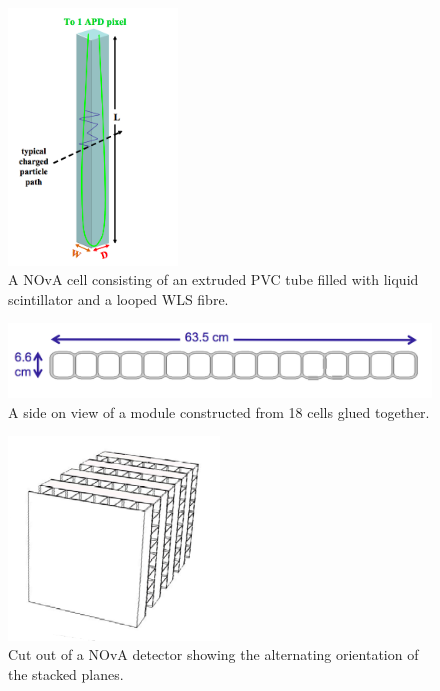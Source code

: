 \begin{figure}
  \centering
  \includegraphics[width=0.4\textwidth]{../../img/det/gen/nova_cell.png}
  \caption{A NOvA cell consisting of an extruded
    PVC tube filled with liquid scintillator and a looped WLS fibre.}
  \label{fig:cell}
\end{figure}


\begin{figure}
  \centering
  \includegraphics[width=1\textwidth]{../../img/det/gen/extru_cross_section.png}
  \caption{A side on view of a module constructed from 18 cells glued
    together.}
  \label{fig:module}
\end{figure}

\begin{figure}
  \centering
  \includegraphics[width=0.5\textwidth]{../../img/det/gen/planes.png}
  \caption{Cut out of a NOvA detector showing the alternating
    orientation of the stacked planes.}
  \label{fig:stackedPlanes}
\end{figure}


